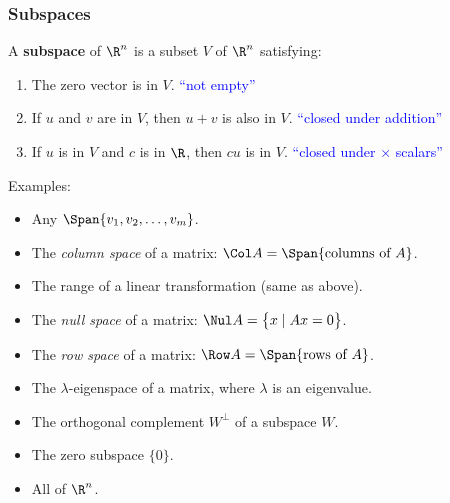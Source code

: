 
\begin{frame}
\frametitle{Subspaces}

\vskip-3mm
\begin{defn}
  A \textbf{subspace} of $\R^n$ is a subset $V$ of $\R^n$ satisfying:
  \begin{enumerate}
  \item The zero vector is in $V$.
    \hfill \textcolor{blue}{``not empty''}
  \item If $u$ and $v$ are in $V$, then $u+v$ is also in $V$.
    \hfill \textcolor{blue}{``closed under addition''}
  \item If $u$ is in $V$ and $c$ is in $\R$, then $cu$ is in $V$.
    \hfill \textcolor{blue}{``closed under $\times$ scalars''}
  \end{enumerate}
\end{defn}

\pause\medskip
\alert{Examples:}
\begin{itemize}
\item Any $\Span\{v_1,v_2,\ldots,v_m\}$.
  \pause
\item The \emph{column space} of a matrix: 
  $\Col A = \Span\{\text{columns of $A$}\}$.
  \pause
\item The range of a linear transformation (same as above).
  \pause
\item The \emph{null space} of a matrix:
  $\Nul A = \bigl\{ x\mid Ax = 0 \bigr\}$.
  \pause
\item The \emph{row space} of a matrix:
  $\Row A = \Span\{\text{rows of $A$}\}$.
  \pause
\item The $\lambda$-eigenspace of a matrix, where $\lambda$ is an eigenvalue.
  \pause
\item The orthogonal complement $W^\perp$ of a subspace $W$.
  \pause
\item The zero subspace $\{0\}$.
  \pause
\item All of $\R^n$.

\end{itemize}

\end{frame}




